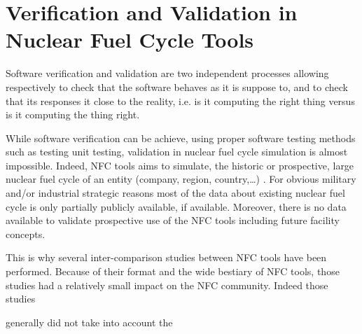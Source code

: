 \section{Verification and Validation in Nuclear Fuel Cycle Tools}

Software verification and validation are two independent processes allowing respectively
to check that the software behaves as it is suppose to, and to check that its
responses it close to the reality, i.e. is it computing the right thing versus is it
computing the thing right.

While software verification can be achieve, using proper software testing
methods such as testing unit testing, validation in nuclear fuel cycle simulation is
almost impossible. 
Indeed, NFC tools aims to simulate, the historic or prospective, large nuclear fuel
cycle of an entity (company, region, country,\ldots) . For obvious
military and/or industrial strategic reasons most of the data about existing
nuclear fuel cycle is only partially publicly available, if available. Moreover,
there is no data available to validate prospective use of the NFC tools including
future facility concepts.

This is why several inter-comparison studies between NFC tools have been
performed. Because of their format and the wide bestiary of NFC
tools, those studies had a relatively small impact on the NFC community. Indeed
those studies 



generally did not take into account the 




